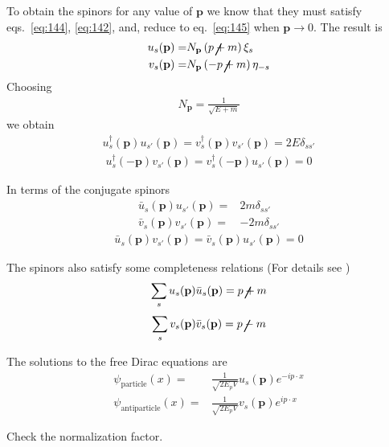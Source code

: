 To obtain the spinors for any value of $\mathbf{p}$ we know that they must satisfy eqs.~\eqref{eq:144}, \eqref{eq:142}, and, reduce to eq.~\eqref{eq:145} when $\mathbf{p}\to 0$. 
The result is
\begin{align}
  u_s(\mathbf{p})=&N_{\mathbf{p}}\left(\cancel{p}+m\right)\xi_s\nonumber\\
  v_s(\mathbf{p})=&N_{\mathbf{p}}\left(-\cancel{p}+m\right)\eta_{-s}
\end{align}
Choosing
\begin{align}
  N_{\mathbf{p}}=\frac{1}{\sqrt{E+m}}
\end{align}
we obtain
\begin{align}
  u_s^\dagger(\mathbf{p})u_{s'}(\mathbf{p})=v_s^\dagger(\mathbf{p})v_{s'}(\mathbf{p})=2E \delta_{s s'}
\end{align}
\begin{align}
  u_s^\dagger(-\mathbf{p})v_{s'}(\mathbf{p})=v_s^\dagger(-\mathbf{p})u_{s'}(\mathbf{p})=0
\end{align}

In terms of the conjugate spinors
\begin{align}
  \bar{u}_s(\mathbf{p})u_{s'}(\mathbf{p})=&2m \delta_{s s'}\nonumber\\
  \bar{v}_s(\mathbf{p})v_{s'}(\mathbf{p})=&-2m \delta_{s s'}
\end{align}
\begin{align}
  \bar{u}_s(\mathbf{p})v_{s'}(\mathbf{p})=\bar{v}_s(\mathbf{p})u_{s'}(\mathbf{p})=0
\end{align}


The spinors also satisfy some completeness relations (For details see \cite{physics/0703214})
\begin{align}
  \sum_s u_s(\mathbf{p})\bar{u}_s(\mathbf{p})=\cancel{p}+m
\end{align}
\begin{align}
  \sum_s v_s(\mathbf{p})\bar{v}_s(\mathbf{p})=\cancel{p}-m
\end{align}

The solutions to the free Dirac equations are
\begin{align}
  \psi_{\text{particle}}(x)=&\frac{1}{\sqrt{2E_p V}}u_s(\mathbf{p})e^{-i p\cdot x}\nonumber\\
  \psi_{\text{antiparticle}}(x)=&\frac{1}{\sqrt{2E_p V}}v_s(\mathbf{p})e^{i p\cdot x}
\end{align}
\begin{inprogress}
  Check the normalization factor.
\end{inprogress}

